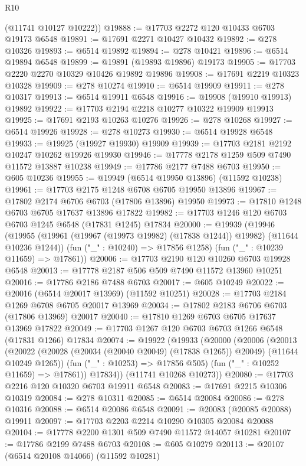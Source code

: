 \begin{lexlean}{R10}
\begin{coremodule}
{{{{{{{{{{{{{{{{{{{{{{{{{{{{{{{{{{{{{{{{{{{{{{{{{{{{{{{{{{{{{{{{{{{{{{{{{{{{{{{{{{{{      (@11741 @10127 @10222))
@19888 := @17703 @2272 @120 @10433 @6703 @19173 @6548
@19891 := @17691 @2271 @10427 @10432
@19892 := @278 @10326
@19893 := @6514 @19892
@19894 := @278 @10421
@19896 := @6514 @19894 @6548
@19899 := @19891 (@19893 @19896) @19173
@19905 := @17703 @2220 @2270 @10329 @10426 @19892 @19896
@19908 := @17691 @2219 @10323 @10328
@19909 := @278 @10274
@19910 := @6514 @19909
@19911 := @278 @10317
@19913 := @6514 @19911 @6548
@19916 := @19908 (@19910 @19913) @19892
@19922 := @17703 @2194 @2218 @10277 @10322 @19909 @19913
@19925 := @17691 @2193 @10263 @10276
@19926 := @278 @10268
@19927 := @6514 @19926
@19928 := @278 @10273
@19930 := @6514 @19928 @6548
@19933 := @19925 (@19927 @19930) @19909
@19939 := @17703 @2181 @2192 @10247 @10262 @19926 @19930
@19946 := @17778 @2178 @1259 @509 @7490 @11572 @13887 @10238
@19949 := @17786 @2177 @7488 @6703
@19950 := @605 @10236
@19955 := @19949 (@6514 @19950 @13896) (@11592 @10238)
@19961 := @17703 @2175 @1248 @6708 @6705 @19950 @13896
@19967 := @17802 @2174 @6706 @6703 (@17806 @13896) @19950
@19973 := @17810 @1248 @6703 @6705 @17637 @13896 @17822
@19982 := @17703 @1246 @120 @6703 @6703 @1245 @6548 (@17831 @1245) @17834
@20000 := @19939
    (@19946
      (@19955 (@19961 (@19967 (@19973 @19982) (@17838 @1244)) @19982) (@11644 @10236 @1244))
      (fun ("_" : @10240) => @17856 @1258)
      (fun ("_" : @10239 @11659) => @17861))
@20006 := @17703 @2190 @120 @10260 @6703 @19928 @6548
@20013 := @17778 @2187 @506 @509 @7490 @11572 @13960 @10251
@20016 := @17786 @2186 @7488 @6703
@20017 := @605 @10249
@20022 := @20016 (@6514 @20017 @13969) (@11592 @10251)
@20028 := @17703 @2184 @1269 @6708 @6705 @20017 @13969
@20034 := @17802 @2183 @6706 @6703 (@17806 @13969) @20017
@20040 := @17810 @1269 @6703 @6705 @17637 @13969 @17822
@20049 := @17703 @1267 @120 @6703 @6703 @1266 @6548 (@17831 @1266) @17834
@20074 := @19922
    (@19933
      (@20000
        (@20006
          (@20013
            (@20022 (@20028 (@20034 (@20040 @20049) (@17838 @1265)) @20049) (@11644 @10249 @1265))
            (fun ("_" : @10253) => @17856 @505)
            (fun ("_" : @10252 @11659) => @17861))
          @17834))
      (@11741 @10268 @10273))
@20080 := @17703 @2216 @120 @10320 @6703 @19911 @6548
@20083 := @17691 @2215 @10306 @10319
@20084 := @278 @10311
@20085 := @6514 @20084
@20086 := @278 @10316
@20088 := @6514 @20086 @6548
@20091 := @20083 (@20085 @20088) @19911
@20097 := @17703 @2203 @2214 @10290 @10305 @20084 @20088
@20104 := @17778 @2200 @1301 @509 @7490 @11572 @14057 @10281
@20107 := @17786 @2199 @7488 @6703
@20108 := @605 @10279
@20113 := @20107 (@6514 @20108 @14066) (@11592 @10281)
}}}}}}}}}}}}}}}}}}}}}}}}}}}}}}}}}}}}}}}}}}}}}}}}}}}}}}}}}}}}}}}}}}}}}}}}}}}}}}}}}}}}
\end{coremodule}
\end{lexlean}

